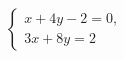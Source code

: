 \begin{ex}
	\begin{condition}
		\( \left\{
		\begin{array}{l}
			x+4y-2=0,\\
			3x+8y=2
		\end{array}
		\right. \)
	\end{condition}
\end{ex}